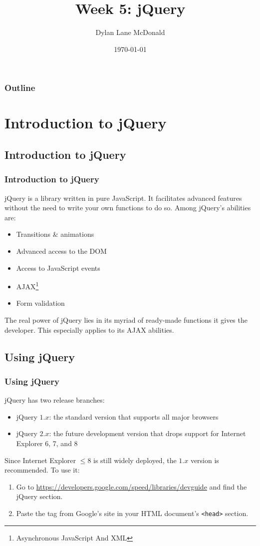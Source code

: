 \documentclass[aspectratio=169]{beamer}
\title{Week 5: jQuery}
\author{Dylan Lane McDonald}
\institute{CNM STEMulus Center\\Web Development with PHP}
\date{\today}
\begin{document}
\lstset{language=Java}
\begin{frame}
\titlepage
\end{frame}

\begin{frame}
\frametitle{Outline}
\tableofcontents
\end{frame}

\section{Introduction to jQuery}
\subsection{Introduction to jQuery}
\begin{frame}
\frametitle{Introduction to jQuery}
jQuery is a library written in pure JavaScript. It facilitates advanced features without the need to write your own functions to do so. Among jQuery's abilities are:
\begin{itemize}
	\item Transitions \& animations
	\item Advanced access to the DOM
	\item Access to JavaScript events
	\item AJAX\footnote{Asynchronous JavaScript And XML}
	\item Form validation
\end{itemize}
The real power of jQuery lies in its myriad of ready-made functions it gives the developer. This especially applies to its AJAX abilities.
\end{frame}


\subsection{Using jQuery}
\begin{frame}
\frametitle{Using jQuery}
jQuery has two release branches:
\begin{itemize}
	\item jQuery $1.x$: the standard version that supports all major browsers
	\item jQuery $2.x$: the future development version that drops support for Internet Explorer 6, 7, and 8
\end{itemize}
Since Internet Explorer $\le 8$ is still widely deployed, the $1.x$ version is recommended. To use it:
\begin{enumerate}
	\item Go to \url{https://developers.google.com/speed/libraries/devguide} and find the jQuery section.
	\item Paste the tag from Google's site in your HTML document's \texttt{<head>} section.
\end{enumerate}
\end{frame}
\end{document}
